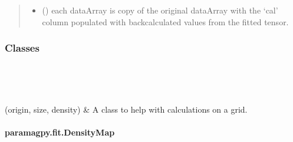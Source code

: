 \documentclass[a4paper,10pt,english,openany,oneside]{sphinxmanual}
\begin{document}
\begin{fulllineitems}
\begin{quote}
\begin{description}
\begin{itemize}
\item {} 
\sphinxAtStartPar
{} () \textendash{} each dataArray is copy of the original dataArray with
the ‘cal’ column populated with back\sphinxhyphen{}calculated values from the
fitted tensor.

\end{itemize}


\end{description}\end{quote}

\end{fulllineitems}

\subsubsection*{Classes}


\begin{savenotes}\sphinxatlongtablestart\begin{longtable}[c]{}
\hline

\endfirsthead

%
{}\\
\hline

\endhead

\hline
{}\\
\endfoot

\endlastfoot

\sphinxAtStartPar
{\hyperref[\detokenize{reference/generated/paramagpy.fit.DensityMap:paramagpy.fit.DensityMap}]{}}(origin, size, density)
&
\sphinxAtStartPar
A class to help with calculations on a grid.
\\
\hline
\end{longtable}\sphinxatlongtableend\end{savenotes}


\paragraph{paramagpy.fit.DensityMap}
\label{\detokenize{reference/generated/paramagpy.fit.DensityMap:paramagpy-fit-densitymap}}\label{\detokenize{reference/generated/paramagpy.fit.DensityMap::doc}}
\end{document}
